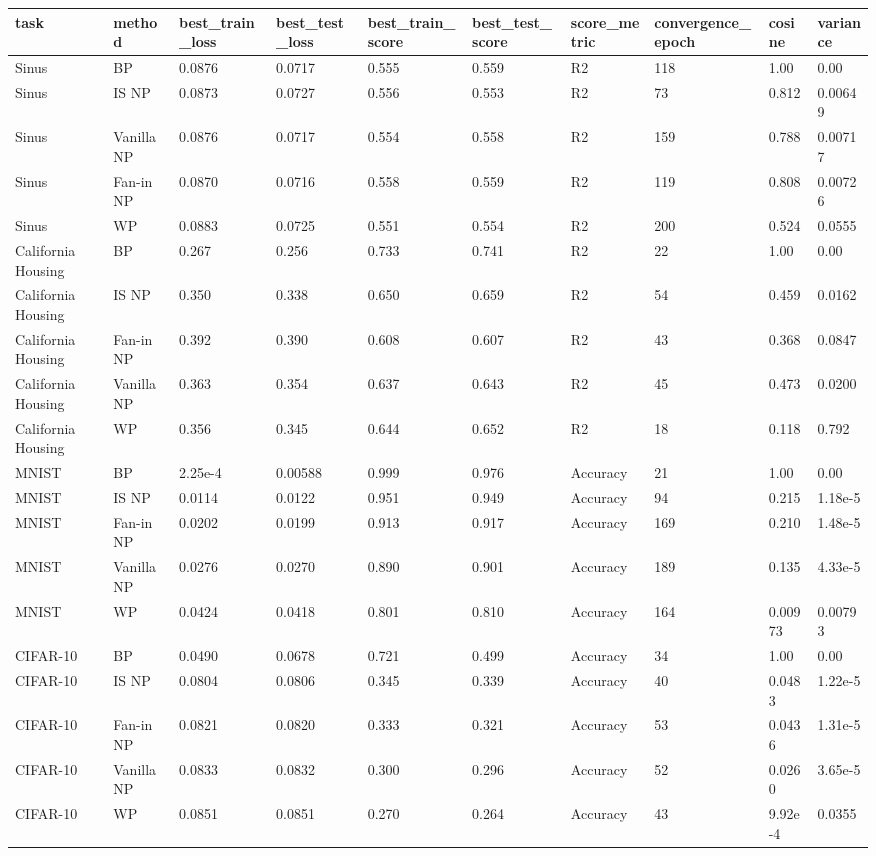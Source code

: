 \begin{tabular}{llllllllll}
\toprule
task & method & best\_train\_loss & best\_test\_loss & best\_train\_score & best\_test\_score & score\_metric & convergence\_epoch & cosine & variance \\
\midrule
Sinus & BP & 0.0876 & 0.0717 & 0.555 & 0.559 & R2 & 118 & 1.00 & 0.00 \\
Sinus & IS NP & 0.0873 & 0.0727 & 0.556 & 0.553 & R2 & 73 & 0.812 & 0.00649 \\
Sinus & Vanilla NP & 0.0876 & 0.0717 & 0.554 & 0.558 & R2 & 159 & 0.788 & 0.00717 \\
Sinus & Fan-in NP & 0.0870 & 0.0716 & 0.558 & 0.559 & R2 & 119 & 0.808 & 0.00726 \\
Sinus & WP & 0.0883 & 0.0725 & 0.551 & 0.554 & R2 & 200 & 0.524 & 0.0555 \\
California Housing & BP & 0.267 & 0.256 & 0.733 & 0.741 & R2 & 22 & 1.00 & 0.00 \\
California Housing & IS NP & 0.350 & 0.338 & 0.650 & 0.659 & R2 & 54 & 0.459 & 0.0162 \\
California Housing & Fan-in NP & 0.392 & 0.390 & 0.608 & 0.607 & R2 & 43 & 0.368 & 0.0847 \\
California Housing & Vanilla NP & 0.363 & 0.354 & 0.637 & 0.643 & R2 & 45 & 0.473 & 0.0200 \\
California Housing & WP & 0.356 & 0.345 & 0.644 & 0.652 & R2 & 18 & 0.118 & 0.792 \\
MNIST & BP & 2.25e-4 & 0.00588 & 0.999 & 0.976 & Accuracy & 21 & 1.00 & 0.00 \\
MNIST & IS NP & 0.0114 & 0.0122 & 0.951 & 0.949 & Accuracy & 94 & 0.215 & 1.18e-5 \\
MNIST & Fan-in NP & 0.0202 & 0.0199 & 0.913 & 0.917 & Accuracy & 169 & 0.210 & 1.48e-5 \\
MNIST & Vanilla NP & 0.0276 & 0.0270 & 0.890 & 0.901 & Accuracy & 189 & 0.135 & 4.33e-5 \\
MNIST & WP & 0.0424 & 0.0418 & 0.801 & 0.810 & Accuracy & 164 & 0.00973 & 0.00793 \\
CIFAR-10 & BP & 0.0490 & 0.0678 & 0.721 & 0.499 & Accuracy & 34 & 1.00 & 0.00 \\
CIFAR-10 & IS NP & 0.0804 & 0.0806 & 0.345 & 0.339 & Accuracy & 40 & 0.0483 & 1.22e-5 \\
CIFAR-10 & Fan-in NP & 0.0821 & 0.0820 & 0.333 & 0.321 & Accuracy & 53 & 0.0436 & 1.31e-5 \\
CIFAR-10 & Vanilla NP & 0.0833 & 0.0832 & 0.300 & 0.296 & Accuracy & 52 & 0.0260 & 3.65e-5 \\
CIFAR-10 & WP & 0.0851 & 0.0851 & 0.270 & 0.264 & Accuracy & 43 & 9.92e-4 & 0.0355 \\
\bottomrule
\end{tabular}
